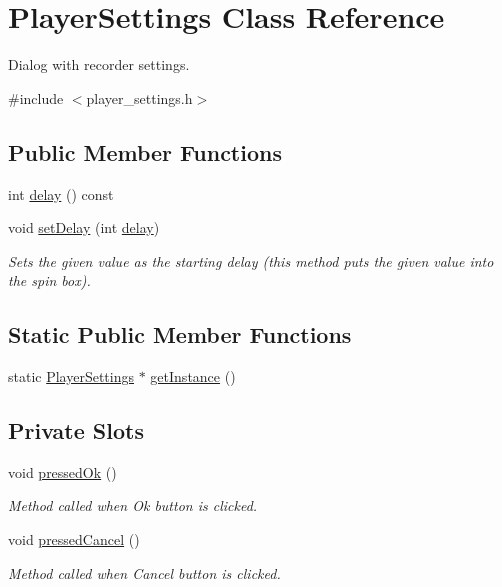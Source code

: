 \hypertarget{class_player_settings}{\section{Player\-Settings Class Reference}
\label{class_player_settings}
}


Dialog with recorder settings.  




{\ttfamily \#include $<$player\-\_\-settings.\-h$>$}

\subsection*{Public Member Functions}
\begin{DoxyCompactItemize}
\item 
int \hyperlink{class_player_settings_a8623e14748ce11be3649970595af6e19}{delay} () const 
\item 
void \hyperlink{class_player_settings_ae25f8572430916f24aa57bd26d080a45}{set\-Delay} (int \hyperlink{class_player_settings_a8623e14748ce11be3649970595af6e19}{delay})
\begin{DoxyCompactList}\small\item\em Sets the given value as the starting delay (this method puts the given value into the spin box). \end{DoxyCompactList}\end{DoxyCompactItemize}
\subsection*{Static Public Member Functions}
\begin{DoxyCompactItemize}
\item 
static \hyperlink{class_player_settings}{Player\-Settings} $\ast$ \hyperlink{class_player_settings_a28b62d5e7d71353db0c554fea98c7681}{get\-Instance} ()
\end{DoxyCompactItemize}
\subsection*{Private Slots}
\begin{DoxyCompactItemize}
\item 
void \hyperlink{class_player_settings_adb8d1058a44440fb6658d0b9b2e20e88}{pressed\-Ok} ()
\begin{DoxyCompactList}\small\item\em Method called when Ok button is clicked. \end{DoxyCompactList}\item 
void \hyperlink{class_player_settings_a2de1894c53c0862c869eab320fd041d2}{pressed\-Cancel} ()
\begin{DoxyCompactList}\small\item\em Method called when Cancel button is clicked. \end{DoxyCompactList}\end{DoxyCompactItemize}
